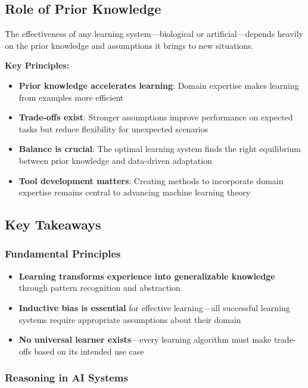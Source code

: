 \subsection{Role of Prior Knowledge}

The effectiveness of any learning system—biological or artificial—depends heavily on the prior knowledge and assumptions it brings to new situations.

\textbf{Key Principles:}

\begin{itemize}
\item \textbf{Prior knowledge accelerates learning}: Domain expertise makes learning from examples more efficient
\item \textbf{Trade-offs exist}: Stronger assumptions improve performance on expected tasks but reduce flexibility for unexpected scenarios  
\item \textbf{Balance is crucial}: The optimal learning system finds the right equilibrium between prior knowledge and data-driven adaptation
\item \textbf{Tool development matters}: Creating methods to incorporate domain expertise remains central to advancing machine learning theory
\end{itemize}

\subsection{Key Takeaways}

\subsubsection{Fundamental Principles}

\begin{itemize}
\item \textbf{Learning transforms experience into generalizable knowledge} through pattern recognition and abstraction
\item \textbf{Inductive bias is essential} for effective learning—all successful learning systems require appropriate assumptions about their domain
\item \textbf{No universal learner exists}—every learning algorithm must make trade-offs based on its intended use case
\end{itemize}

\subsubsection{Reasoning in AI Systems}

